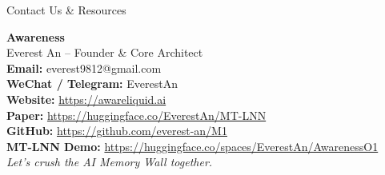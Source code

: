 ﻿\documentclass[aspectratio=169, 10pt]{beamer}
\begin{document}
\begin{frame}{Contact Us \& Resources}
\begin{center}
    \LARGE \textbf{Awareness} \\
    \vspace{0.5em}
    \large Everest An -- Founder \& Core Architect \\
    \vspace{1.5em}
    \normalsize
    \textbf{Email:} everest9812@gmail.com \\
    \textbf{WeChat / Telegram:} EverestAn \\
    \vspace{1.5em}
    \small
    \textbf{Website:} \url{https://awareliquid.ai} \\
    \textbf{Paper:} \url{https://huggingface.co/EverestAn/MT-LNN} \\
    \textbf{GitHub:} \url{https://github.com/everest-an/M1} \\
    \textbf{MT-LNN Demo:} \url{https://huggingface.co/spaces/EverestAn/AwarenessO1} \\
    \vspace{1.5em}
    \textit{Let's crush the AI Memory Wall together.}
\end{center}
\end{frame}
\end{document}
